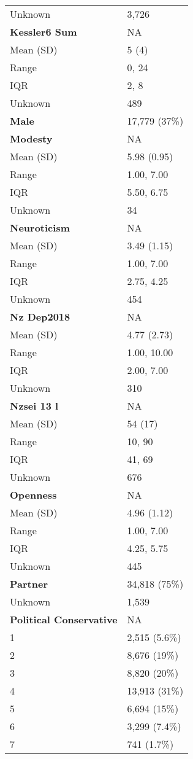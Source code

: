 \documentclass[
  single column]{article}
\begin{document}
\begin{longtable}[]{@{}ll@{}}
Unknown & 3,726 \\
\textbf{Kessler6 Sum} & NA \\
Mean (SD) & 5 (4) \\
Range & 0, 24 \\
IQR & 2, 8 \\
Unknown & 489 \\
\textbf{Male} & 17,779 (37\%) \\
\textbf{Modesty} & NA \\
Mean (SD) & 5.98 (0.95) \\
Range & 1.00, 7.00 \\
IQR & 5.50, 6.75 \\
Unknown & 34 \\
\textbf{Neuroticism} & NA \\
Mean (SD) & 3.49 (1.15) \\
Range & 1.00, 7.00 \\
IQR & 2.75, 4.25 \\
Unknown & 454 \\
\textbf{Nz Dep2018} & NA \\
Mean (SD) & 4.77 (2.73) \\
Range & 1.00, 10.00 \\
IQR & 2.00, 7.00 \\
Unknown & 310 \\
\textbf{Nzsei 13 l} & NA \\
Mean (SD) & 54 (17) \\
Range & 10, 90 \\
IQR & 41, 69 \\
Unknown & 676 \\
\textbf{Openness} & NA \\
Mean (SD) & 4.96 (1.12) \\
Range & 1.00, 7.00 \\
IQR & 4.25, 5.75 \\
Unknown & 445 \\
\textbf{Partner} & 34,818 (75\%) \\
Unknown & 1,539 \\
\textbf{Political Conservative} & NA \\
1 & 2,515 (5.6\%) \\
2 & 8,676 (19\%) \\
3 & 8,820 (20\%) \\
4 & 13,913 (31\%) \\
5 & 6,694 (15\%) \\
6 & 3,299 (7.4\%) \\
7 & 741 (1.7\%) \\

\end{longtable}
\end{document}
